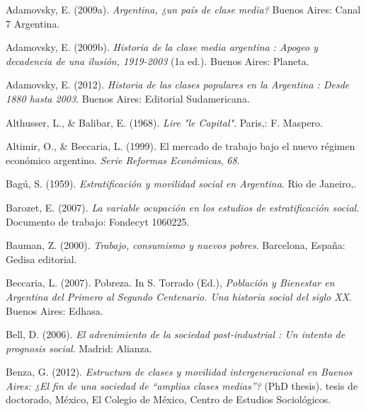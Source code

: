 \documentclass[
]{article}
\newlength{\cslhangindent}
\newlength{\cslentryspacingunit} %
\newenvironment{CSLReferences}[2] %
 {%
  \setlength{\parindent}{0pt}
  \ifodd #1
  \let\oldpar\par
  \def\par{\hangindent=\cslhangindent\oldpar}
  \fi
  \setlength{\parskip}{#2\cslentryspacingunit}
 }%
 {}
\begin{document}
\hypertarget{refs}{}
\begin{CSLReferences}{1}{0}
\leavevmode{}%
Adamovsky, E. (2009a). \emph{Argentina, ¿un país de clase media?} Buenos Aires: Canal 7 Argentina.

\leavevmode{}%
Adamovsky, E. (2009b). \emph{Historia de la clase media argentina : Apogeo y decadencia de una ilusión, 1919-2003} (1a ed.). Buenos Aires: Planeta.

\leavevmode{}%
Adamovsky, E. (2012). \emph{Historia de las clases populares en la {Argentina} : Desde 1880 hasta 2003}. Buenos Aires: Editorial Sudamericana.

\leavevmode{}%
Althusser, L., \& Balibar, E. (1968). \emph{Lire "le {Capital}"}. Paris,: F. Maspero.

\leavevmode{}%
Altimir, O., \& Beccaria, L. (1999). El mercado de trabajo bajo el nuevo régimen económico argentino. \emph{Serie Reformas Económicas}, \emph{68}.

\leavevmode{}%
Bagú, S. (1959). \emph{Estratificación y movilidad social en {Argentina}}. Rio de Janeiro,.

\leavevmode{}%
Barozet, E. (2007). \emph{La variable ocupación en los estudios de estratificación social}. Documento de trabajo: Fondecyt 1060225.

\leavevmode{}%
Bauman, Z. (2000). \emph{Trabajo, consumismo y nuevos pobres}. Barcelona, España: Gedisa editorial.

\leavevmode{}%
Beccaria, L. (2007). Pobreza. In S. Torrado (Ed.), \emph{Población y {Bienestar} en {Argentina} del {Primero} al {Segundo} {Centenario}. {Una} historia social del siglo {XX}}. Buenos Aires: Edhasa.

\leavevmode{}%
Bell, D. (2006). \emph{El advenimiento de la sociedad post-industrial : Un intento de prognosis social}. Madrid: Alianza.

\leavevmode{}%
Benza, G. (2012). \emph{Estructura de clases y movilidad intergeneracional en {Buenos} {Aires}: ¿El fin de una sociedad de {``amplias clases medias''}?} (PhD thesis). tesis de doctorado, México, El Colegio de México, Centro de Estudios Sociológicos.


\end{CSLReferences}
\end{document}
